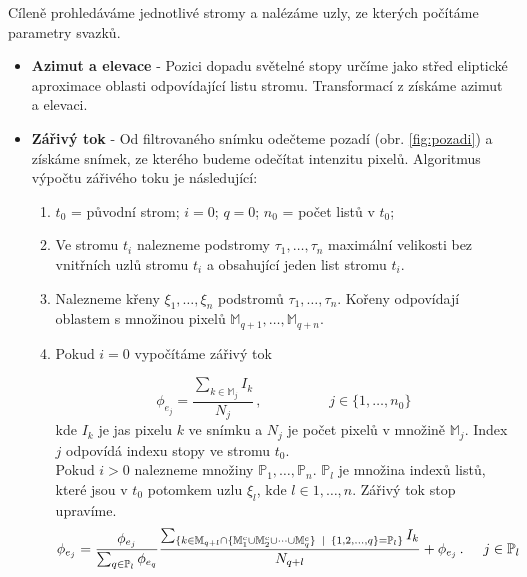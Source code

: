 Cíleně prohledáváme jednotlivé stromy a nalézáme uzly, ze kterých počítáme parametry svazků.

\begin{itemize}
	\item \textbf{Azimut a elevace} - Pozici dopadu světelné stopy určíme jako střed eliptické aproximace oblasti odpovídající listu stromu. Transformací z \cite{Drapela} získáme azimut a elevaci.
	
	\item \textbf{Zářivý tok} - 
	Od filtrovaného snímku odečteme pozadí (obr. \ref{fig:pozadi}) a získáme snímek, ze kterého budeme odečítat intenzitu pixelů. Algoritmus výpočtu zářivého toku je následující:
	\begin{enumerate}
	\item $t_0$ = původní strom; $i = 0$; $q = 0$; $n_0$ = počet listů v $t_0$;
	
	\item Ve stromu $t_i$ nalezneme podstromy $\tau_1,\dots,\tau_n$ maximální velikosti bez vnitřních uzlů stromu $t_i$ a obsahující jeden list stromu $t_i$.  
	
	\item Nalezneme křeny $\xi_1,\dots,\xi_n$ podstromů $\tau_1,\dots,\tau_n$. Kořeny odpovídají oblastem s množinou pixelů $\mathbb{M}_{q+1},\dots,\mathbb{M}_{q+n}$.
	
	\item Pokud $i = 0$ vypočítáme zářivý tok 
	
	\begin{equation}
	\phi_{e_j} = \frac{\sum_{k\in\mathbb{M}_j} I_k}{N_j}\,,\hspace{2cm} j\in\lbrace1,\dots,n_0\rbrace
	\end{equation}
	kde $I_k$ je jas pixelu $k$ ve snímku a $N_j$ je počet pixelů v množině $\mathbb{M}_j$. Index $j$ odpovídá indexu stopy ve stromu $t_0$.\\
	
	Pokud $i > 0$ nalezneme množiny $\mathbb{P}_1,\dots,\mathbb{P}_n$. $\mathbb{P}_l$ je množina indexů listů, které jsou v $t_0$ potomkem uzlu $\xi_l$, kde $l\in {1,\dots,n}$. Zářivý tok stop upravíme.  
	 \begin{equation}
	\phi_{e_j} = \frac{\phi_{e_j}}{\sum_{q\in \mathbb{P}_l}\phi_{e_q}}\frac{\sum_{\lbrace k\in\mathbb{M}_{q+l}\cap\lbrace \mathbb{M}_1^c \cup \mathbb{M}_2^c \cup \dots \cup \mathbb{M}_q^c \rbrace\hspace{1.5mm}|\hspace{1.5mm} \lbrace1,2,\dots,q\rbrace = \mathbb{P}_l \rbrace} I_k}{N_{q+l}} + \phi_{e_j}\,.\hspace{0.5cm} j\in \mathbb{P}_l
	\end{equation}
	

\end{enumerate}
\end{itemize}
